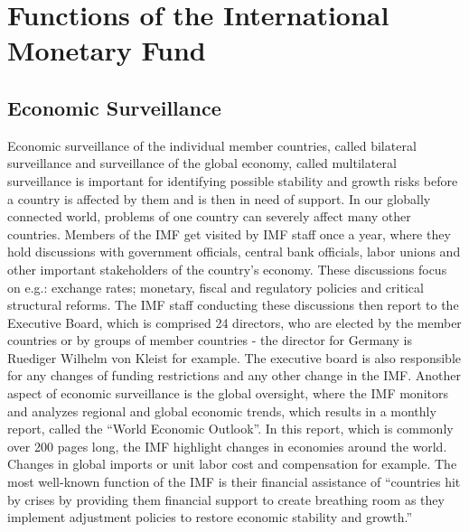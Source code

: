 \section{Functions of the International Monetary Fund}
\label{sec:functions}

\subsection{Economic Surveillance}
Economic surveillance of the individual member countries, called bilateral surveillance and surveillance of the global economy, called multilateral surveillance is important for identifying possible stability and growth risks before a country is affected by them and is then in need of support. In our globally connected world, problems of one country can severely affect many other countries. Members of the \gls{IMF} get visited by \gls{IMF} staff once a year, where they hold discussions with government officials, central bank officials, labor unions and other important stakeholders of the country’s economy. These discussions focus on e.g.: exchange rates; monetary, fiscal and regulatory policies and critical structural reforms. The \gls{IMF} staff conducting these discussions then report to the Executive Board, which is comprised 24 directors, who are elected by the member countries or by groups of member countries - the director for Germany is Ruediger Wilhelm von Kleist for example. The executive board is also responsible for any changes of funding restrictions and any other change in the \gls{IMF}. Another aspect of economic surveillance is the global oversight, where the \gls{IMF} monitors and analyzes regional and global economic trends, which results in a monthly report, called the \enquote{World Economic Outlook}. In this report, which is commonly over 200 pages long, the \gls{IMF} highlight changes in economies around the world. Changes in global imports or unit labor cost and compensation for example. The most well-known function of the \gls{IMF} is their financial assistance of \enquote{countries hit by crises by providing them financial support to create breathing room as they implement adjustment policies to restore economic stability and growth.}\cite{InternationalMonetaryFundIMFLending2020}
